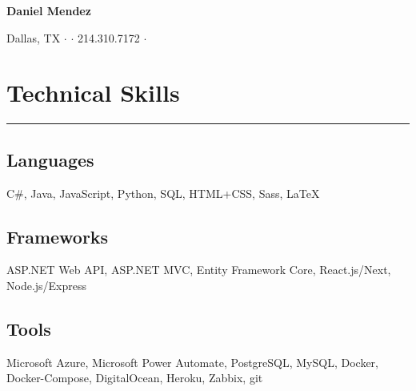 \documentclass[10pt]{article}
\begin{document}
\begin{center}
    \large{\huge\textbf{Daniel Mendez}}
\end{center}
\begin{center}
    Dallas, TX {\onehalfspacing} $\cdot$ {\onehalfspacing} \textit{\href{https://mail.google.com/mail/?view=cm&fs=1&to=dmtx97@gmail.com}{\underline{}}} {\onehalfspacing} $\cdot$ {\onehalfspacing} 214.310.7172 {\onehalfspacing} $\cdot$ {\onehalfspacing} \textit{\href{https://danielmendez.site}{\underline{}}}
\end{center}

\section*{Technical Skills}
\vspace{-.6cm}
\par\noindent\textcolor{black}{\rule{\textwidth}{.5pt}} 
\vspace{-.8cm}
\begin{paracol}{2}
    \begin{leftcolumn} 
        \sloppy
        \subsection*{Languages}
        \begin{flushleft}            
            C\#, Java, JavaScript, Python, SQL, HTML+CSS, Sass, \LaTeX
        \end{flushleft}
    \end{leftcolumn}

    \begin{rightcolumn} 
        \subsection*{Frameworks}
        \begin{flushleft}            
            ASP.NET Web API, ASP.NET MVC, Entity Framework Core, React.js/Next, Node.js/Express
        \end{flushleft}
    \end{rightcolumn}
\end{paracol}
\vspace{-.6cm}
\subsection*{Tools}
\begin{flushleft}
    Microsoft Azure, Microsoft Power Automate, PostgreSQL, MySQL, Docker, Docker-Compose, DigitalOcean, Heroku, Zabbix, git
\end{flushleft}
\end{document}
